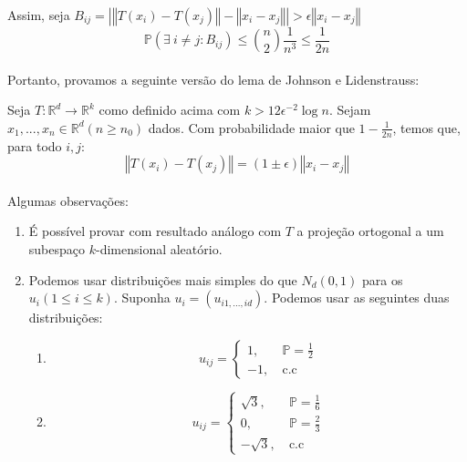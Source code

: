 \paragraph{}Assim, seja $B_{ij} = \left\vert \left\Vert T(x_i) - T(x_j) \right\Vert - \left\Vert x_i - x_j \right\Vert \right\vert > \epsilon\left\Vert x_i - x_j \right\Vert$
\begin{equation*}
    \mathbb{P}(\exists\> i \neq j : B_{ij}) \leq \binom{n}{2}\frac{1}{n^3} \leq \frac{1}{2n}
\end{equation*}
\paragraph{}Portanto, provamos a seguinte versão do lema de Johnson e Lidenstrauss:
\begin{teorema}
Seja $T \colon \mathbb{R}^d \to \mathbb{R}^k$ como definido acima com $k > 12\epsilon^{-2}\log{n}$. Sejam $x_1,...,x_n \in \mathbb{R}^d (n \geq n_0)$ dados. Com probabilidade maior que $1 - \frac{1}{2n}$, temos que, para todo $i,j$:
\begin{equation*}
    \left\Vert T(x_i) - T(x_j) \right\Vert   = (1 \pm \epsilon)\left\Vert x_i - x_j \right\Vert
\end{equation*}
\end{teorema}

\paragraph{}Algumas observações:
\begin{enumerate}
    \item É possível provar com resultado análogo com $T$ a projeção ortogonal a um subespaço $k$-dimensional aleatório.
    \item Podemos usar distribuições mais simples do que $N_d(0,1)$ para os $u_i(1 \leq i \leq k)$. Suponha $u_i = (u_{i1,...,id})$. Podemos usar as seguintes duas distribuições:
    \begin{enumerate}
        \item 
        \[
                 u_{ij}=   \begin{cases} 
                        1,&\ \mathbb{P}=\frac{1}{2}\\ 
                        -1,&\ \text{c.c}\end{cases}
        \]
        \item
        \[
                 u_{ij}=   \begin{cases} 
                        \sqrt{3},&\ \mathbb{P}=\frac{1}{6}\\ 
                        0,&\ \mathbb{P}=\frac{2}{3} \\
                        -\sqrt{3},&\ \text{c.c}\end{cases}
        \]
    \end{enumerate}
\end{enumerate}
